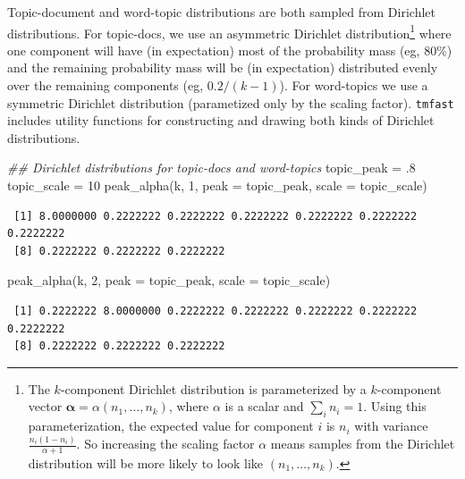 \documentclass[
]{article}
\newenvironment{Shaded}{\begin{snugshade}}{\end{snugshade}}
\newcommand{\AttributeTok}[1]{\textcolor[rgb]{0.40,0.45,0.13}{#1}}
\newcommand{\DecValTok}[1]{\textcolor[rgb]{0.68,0.00,0.00}{#1}}
\newcommand{\DocumentationTok}[1]{\textcolor[rgb]{0.37,0.37,0.37}{\textit{#1}}}
\newcommand{\FunctionTok}[1]{\textcolor[rgb]{0.28,0.35,0.67}{#1}}
\newcommand{\NormalTok}[1]{\textcolor[rgb]{0.00,0.23,0.31}{#1}}
\newcommand{\OtherTok}[1]{\textcolor[rgb]{0.00,0.23,0.31}{#1}}
\begin{document}
Topic-document and word-topic distributions are both sampled from
Dirichlet distributions. For topic-docs, we use an asymmetric Dirichlet
distribution\footnote{The \(k\)-component Dirichlet distribution is
  parameterized by a \(k\)-component vector
  \(\mathbf{\alpha} = \alpha (n_1, \ldots, n_k)\), where \(\alpha\) is a
  scalar and \(\sum_i n_i = 1\). Using this parameterization, the
  expected value for component \(i\) is \(n_i\) with variance
  \(\frac{n_i(1-n_i)}{\alpha + 1}\). So increasing the scaling factor
  \(\alpha\) means samples from the Dirichlet distribution will be more
  likely to look like \((n_1, \ldots, n_k)\).} where one component will
have (in expectation) most of the probability mass (eg, 80\%) and the
remaining probability mass will be (in expectation) distributed evenly
over the remaining components (eg, \(0.2/(k-1)\)). For word-topics we
use a symmetric Dirichlet distribution (parametized only by the scaling
factor). \texttt{tmfast} includes utility functions for constructing and
drawing both kinds of Dirichlet distributions.

\begin{Shaded}
\begin{Highlighting}[]
\DocumentationTok{\#\# Dirichlet distributions for topic{-}docs and word{-}topics}
\NormalTok{topic\_peak }\OtherTok{=}\NormalTok{ .}\DecValTok{8}
\NormalTok{topic\_scale }\OtherTok{=} \DecValTok{10}
\FunctionTok{peak\_alpha}\NormalTok{(k, }\DecValTok{1}\NormalTok{, }\AttributeTok{peak =}\NormalTok{ topic\_peak, }\AttributeTok{scale =}\NormalTok{ topic\_scale)}
\end{Highlighting}
\end{Shaded}

\begin{verbatim}
 [1] 8.0000000 0.2222222 0.2222222 0.2222222 0.2222222 0.2222222 0.2222222
 [8] 0.2222222 0.2222222 0.2222222
\end{verbatim}

\begin{Shaded}
\begin{Highlighting}[]
\FunctionTok{peak\_alpha}\NormalTok{(k, }\DecValTok{2}\NormalTok{, }\AttributeTok{peak =}\NormalTok{ topic\_peak, }\AttributeTok{scale =}\NormalTok{ topic\_scale)}
\end{Highlighting}
\end{Shaded}

\begin{verbatim}
 [1] 0.2222222 8.0000000 0.2222222 0.2222222 0.2222222 0.2222222 0.2222222
 [8] 0.2222222 0.2222222 0.2222222
\end{verbatim}
\end{document}
